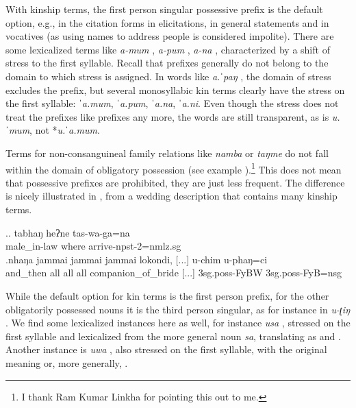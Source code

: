 


With kinship terms, the first person singular possessive prefix is the default option, e.g., in the citation forms in elicitations, in general statements and in vocatives (as using names to address people is considered impolite). There are some lexicalized terms like \emph{a-mum} , \emph{a-pum} , \emph{a-na} , characterized by a shift of stress to the first syllable. Recall that prefixes generally do not belong to the domain to which stress is assigned. In words like \emph{a.ˈpaŋ} , the domain of stress excludes the prefix, but several monosyllabic kin terms clearly have the stress on the first syllable: \emph{ˈa.mum}, \emph{ˈa.pum}, \emph{ˈa.na}, \emph{ˈa.ni}. Even though the stress does not treat the prefixes like prefixes any more, the words are still transparent, as  is \emph{u.ˈmum}, not *\emph{u.ˈa.mum}.

Terms for non-consanguineal family relations like \emph{namba}  or \emph{taŋme}  do not fall within the domain of obligatory possession (see example \Next[a]).\footnote{I thank Ram Kumar Linkha for pointing this out to me.} This does not mean that possessive prefixes are prohibited, they are just less frequent. The difference is nicely illustrated in \Next[b], from a wedding description that contains many kinship terms. 

\ex.\ag. tabhaŋ heʔne tas-wa-ga=na\\
 	male\_in-law where arrive{\sc -npst-2=nmlz.sg}\\
\bg.nhaŋa   jammai jammai jammai lokondi,     [...] u-chim u-phaŋ=ci \\
and\_then all all all companion\_of\_bride [...] {\sc 3sg.poss-}FyBW {\sc 3sg.poss-}FyB{\sc =nsg}\\
 
	
While the default option for kin terms is the first person prefix, for the other obligatorily possessed nouns it is the third person singular, as for instance in \emph{u-ʈiŋ} . We find some lexicalized instances here as well, for instance \emph{usa} , stressed on the first syllable and lexicalized from the more general noun \emph{sa}, translating as  and . Another instance is \emph{uwa} , also stressed on the first syllable, with the original meaning  or, more generally, . 

